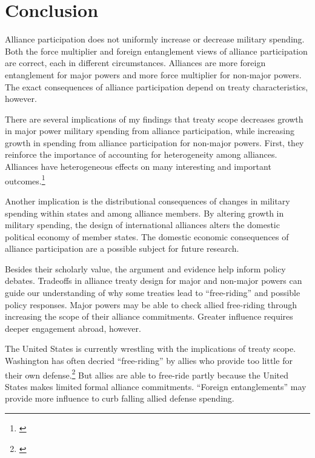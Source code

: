 \documentclass[12pt]{article}
\begin{document}
\section{Conclusion}

Alliance participation does not uniformly increase or decrease military spending. 
Both the force multiplier and foreign entanglement views of alliance participation are correct, each in different circumstances.
Alliances are more foreign entanglement for major powers and more force multiplier for non-major powers. 
The exact consequences of alliance participation depend on treaty characteristics, however. 


There are several implications of my findings that treaty scope decreases growth in major power military spending from alliance participation, while increasing growth in spending from alliance participation for non-major powers.  
First, they reinforce the importance of accounting for heterogeneity among alliances.
Alliances have heterogeneous effects on many interesting and important outcomes.\footnote{\cite{Leeds2003, Benson2012, DigiuseppePoast2016}} 


Another implication is the distributional consequences of changes in military spending within states and among alliance members.  
By altering growth in military spending, the design of international alliances alters the domestic political economy of member states. 
The domestic economic consequences of alliance participation are a possible subject for future research. 


Besides their scholarly value, the argument and evidence help inform policy debates. 
Tradeoffs in alliance treaty design for major and non-major powers can guide our understanding of why some treaties lead to ``free-riding'' and possible policy responses. 
Major powers may be able to check allied free-riding through increasing the scope of their alliance commitments. 
Greater influence requires deeper engagement abroad, however. 


The United States is currently wrestling with the implications of treaty scope. 
Washington has often decried ``free-riding'' by allies who provide too little for their own defense.\footnote{\cite{Lanoszka2015}} 
But allies are able to free-ride partly because the United States makes limited formal alliance commitments. 
``Foreign entanglements'' may provide more influence to curb falling allied defense spending. 
\end{document}
